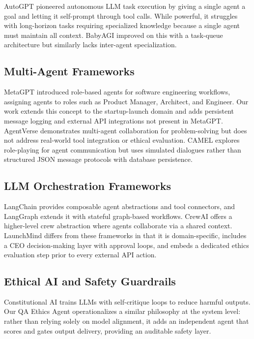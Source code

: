 \documentclass[conference]{IEEEtran}
\begin{document}
AutoGPT \cite{autogpt2023} pioneered autonomous LLM task execution by giving a single agent a goal and letting it self-prompt through tool calls. While powerful, it struggles with long-horizon tasks requiring specialized knowledge because a single agent must maintain all context. BabyAGI \cite{babyagi2023} improved on this with a task-queue architecture but similarly lacks inter-agent specialization.

\subsection{Multi-Agent Frameworks}

MetaGPT \cite{metagpt2023} introduced role-based agents for software engineering workflows, assigning agents to roles such as Product Manager, Architect, and Engineer. Our work extends this concept to the startup-launch domain and adds persistent message logging and external API integrations not present in MetaGPT. AgentVerse \cite{agentverse2023} demonstrates multi-agent collaboration for problem-solving but does not address real-world tool integration or ethical evaluation. CAMEL \cite{camel2023} explores role-playing for agent communication but uses simulated dialogues rather than structured JSON message protocols with database persistence.

\subsection{LLM Orchestration Frameworks}

LangChain \cite{langchain2022} provides composable agent abstractions and tool connectors, and LangGraph extends it with stateful graph-based workflows. CrewAI \cite{crewai2024} offers a higher-level crew abstraction where agents collaborate via a shared context. LaunchMind differs from these frameworks in that it is domain-specific, includes a CEO decision-making layer with approval loops, and embeds a dedicated ethics evaluation step prior to every external API action.

\subsection{Ethical AI and Safety Guardrails}

Constitutional AI \cite{bai2022constitutional} trains LLMs with self-critique loops to reduce harmful outputs. Our QA Ethics Agent operationalizes a similar philosophy at the system level: rather than relying solely on model alignment, it adds an independent agent that scores and gates output delivery, providing an auditable safety layer.
\end{document}
